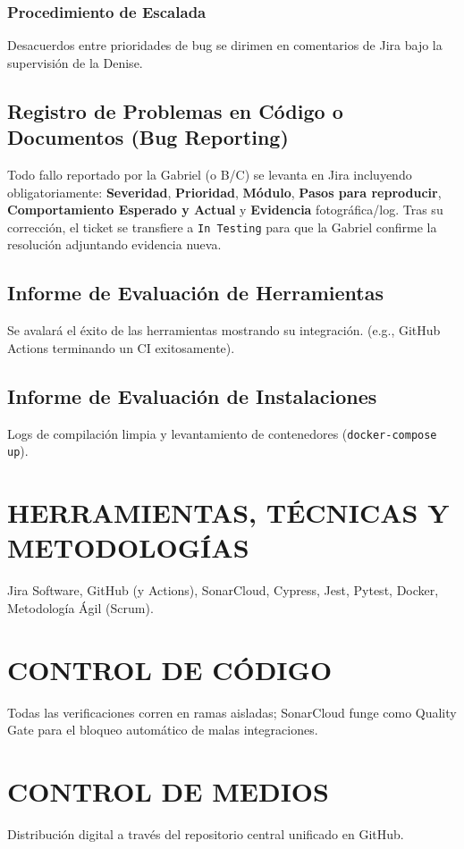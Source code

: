 \documentclass[12pt,a4paper]{article}
\begin{document}
\subsubsection{Procedimiento de Escalada}
Desacuerdos entre prioridades de bug se dirimen en comentarios de Jira bajo la supervisión de la Denise.

\subsection{Registro de Problemas en Código o Documentos (Bug Reporting)}
Todo fallo reportado por la Gabriel (o B/C) se levanta en Jira incluyendo obligatoriamente: \textbf{Severidad}, \textbf{Prioridad}, \textbf{Módulo}, \textbf{Pasos para reproducir}, \textbf{Comportamiento Esperado y Actual} y \textbf{Evidencia} fotográfica/log. Tras su corrección, el ticket se transfiere a \texttt{In Testing} para que la Gabriel confirme la resolución adjuntando evidencia nueva.

\subsection{Informe de Evaluación de Herramientas}
Se avalará el éxito de las herramientas mostrando su integración. (e.g., GitHub Actions terminando un CI exitosamente).

\subsection{Informe de Evaluación de Instalaciones}
Logs de compilación limpia y levantamiento de contenedores (\texttt{docker-compose up}).

\section{HERRAMIENTAS, TÉCNICAS Y METODOLOGÍAS}
Jira Software, GitHub (y Actions), SonarCloud, Cypress, Jest, Pytest, Docker, Metodología Ágil (Scrum).

\section{CONTROL DE CÓDIGO}
Todas las verificaciones corren en ramas aisladas; SonarCloud funge como Quality Gate para el bloqueo automático de malas integraciones.

\section{CONTROL DE MEDIOS}
Distribución digital a través del repositorio central unificado en GitHub.
\end{document}
